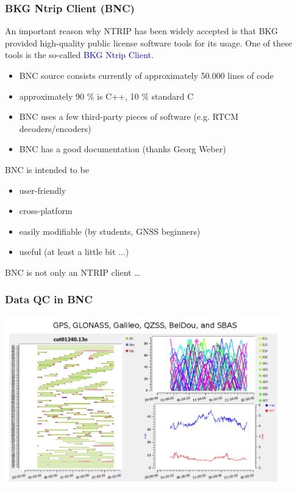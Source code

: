 \documentclass[10pt]{beamer}
\begin{document}
\begin{frame}
\frametitle{BKG Ntrip Client (BNC)}

An important reason why NTRIP has been widely accepted is that BKG provided high-quality public
license software tools for its usage. One of these tools is the so-called \textcolor{blue}{BKG
Ntrip Client}.

  \begin{itemize}
  \item BNC source consists currently of approximately 50.000 lines of code 
  \item approximately 90 \% is C++, 10 \% standard C
  \item BNC uses a few third-party pieces of software (e.g. RTCM decoders/encoders)
  \item BNC has a good documentation (thanks Georg Weber)
  \end{itemize}

  \begin{block}{BNC is intended to be}
  \begin{itemize}
  \item user-friendly
  \item cross-platform
  \item easily modifiable (by students, GNSS beginners)
  \item useful (at least a little bit ...)
  \end{itemize}
  \end{block}

  \begin{block}{BNC is not only an NTRIP client \ldots}
  \end{block}

\end{frame}


\begin{frame}
  \frametitle{Data QC in BNC}
  \begin{center}
    \includegraphics[width=0.9\textwidth,angle=0]{bnc_qc2.png}
  \end{center}
\end {frame}
\end{document}
